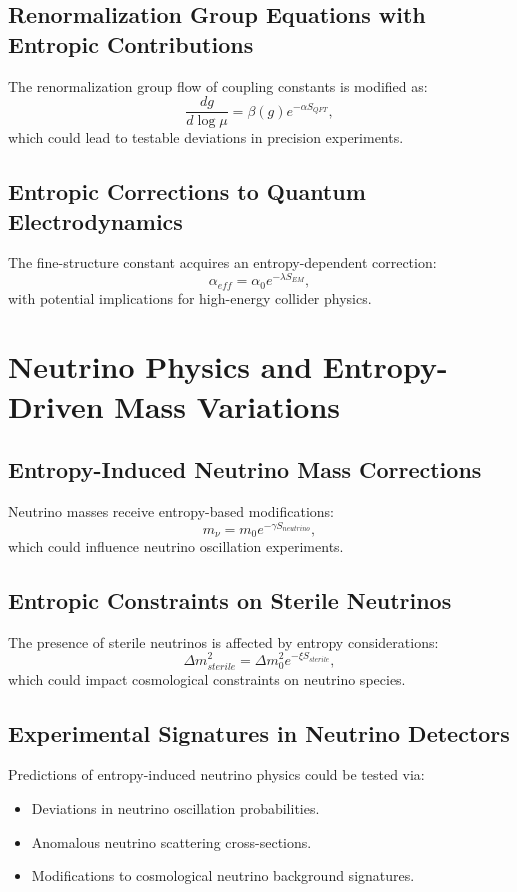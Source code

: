 \documentclass{article}
\begin{document}
\subsection{Renormalization Group Equations with Entropic Contributions}
The renormalization group flow of coupling constants is modified as:
\begin{equation}
\frac{d g}{d \log \mu} = \beta(g) e^{-\alpha S_{QFT}},
\end{equation}
which could lead to testable deviations in precision experiments.

\subsection{Entropic Corrections to Quantum Electrodynamics}
The fine-structure constant acquires an entropy-dependent correction:
\begin{equation}
\alpha_{eff} = \alpha_0 e^{-\lambda S_{EM}},
\end{equation}
with potential implications for high-energy collider physics.

\section{Neutrino Physics and Entropy-Driven Mass Variations}

\subsection{Entropy-Induced Neutrino Mass Corrections}
Neutrino masses receive entropy-based modifications:
\begin{equation}
m_{\nu} = m_{0} e^{-\gamma S_{neutrino}},
\end{equation}
which could influence neutrino oscillation experiments.

\subsection{Entropic Constraints on Sterile Neutrinos}
The presence of sterile neutrinos is affected by entropy considerations:
\begin{equation}
\Delta m^2_{sterile} = \Delta m^2_{0} e^{-\xi S_{sterile}},
\end{equation}
which could impact cosmological constraints on neutrino species.

\subsection{Experimental Signatures in Neutrino Detectors}
Predictions of entropy-induced neutrino physics could be tested via:
\begin{itemize}
    \item Deviations in neutrino oscillation probabilities.
    \item Anomalous neutrino scattering cross-sections.
    \item Modifications to cosmological neutrino background signatures.
\end{itemize}
\end{document}
